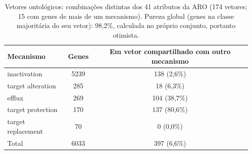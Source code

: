 \begin{table}[htbp]
  \centering
  \caption{Vetores ontológicos: combinações distintas dos 41 atributos da ARO (174 vetores; 15 com genes de mais de um mecanismo). Pureza global (genes na classe majoritária do seu vetor): 98,2\%, calculada no próprio conjunto, portanto otimista.}
  \label{tab:vetores_ontologicos}
  \begin{tabular}{lcc}
    \toprule
    Mecanismo & Genes & Em vetor compartilhado com outro mecanismo \\
    \midrule
    inactivation & 5239 & 138 (2,6\%) \\
    target alteration & 285 & 18 (6,3\%) \\
    efflux & 269 & 104 (38,7\%) \\
    target protection & 170 & 137 (80,6\%) \\
    target replacement & 70 & 0 (0,0\%) \\
    Total & 6033 & 397 (6,6\%) \\
    \bottomrule
  \end{tabular}
\end{table}
